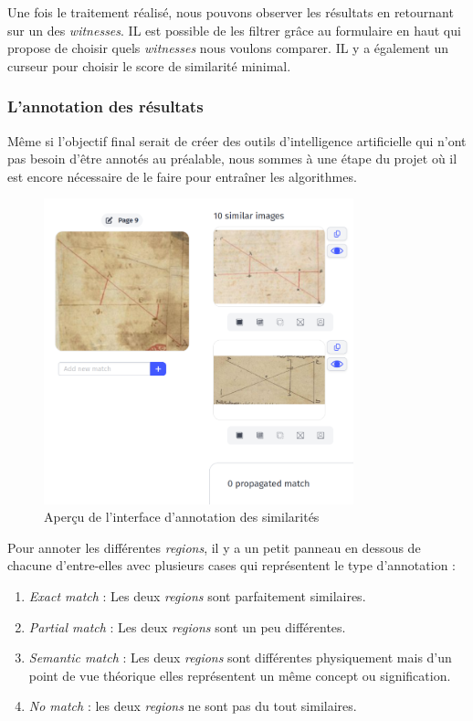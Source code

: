 Une fois le traitement réalisé, nous pouvons observer les résultats en retournant sur un des \textit{witnesses}. 
IL est possible de les filtrer grâce au formulaire en haut qui propose de choisir quels \textit{witnesses} nous voulons comparer. IL y a également un curseur pour choisir le score de similarité minimal.

\subsubsection{L'annotation des résultats}


Même si l'objectif final serait de créer des outils d'intelligence artificielle qui n'ont pas besoin d'être annotés au préalable, nous sommes à une étape du projet où il est encore nécessaire de le faire pour entraîner les algorithmes.

\begin{figure}[H]
	\centering
	\includegraphics[width=0.8\textwidth]{images/annotation_similarities.png}
	\caption{Aperçu de l'interface d'annotation des similarités}
	\label{fig:annotations_similarites}
\end{figure}

Pour annoter les différentes \textit{regions}, il y a un petit panneau en dessous de chacune d'entre-elles avec plusieurs cases qui représentent le type d'annotation : 
\begin{enumerate}
	\item \textit{Exact match} : Les deux \textit{regions} sont parfaitement similaires.
	\item \textit{Partial match} : Les deux \textit{regions} sont un peu différentes.
	\item \textit{Semantic match} : Les deux \textit{regions} sont différentes physiquement mais d'un point de vue théorique elles représentent un même concept ou signification.
	\item \textit{No match} : les deux \textit{regions} ne sont pas du tout similaires.
\end{enumerate} 


